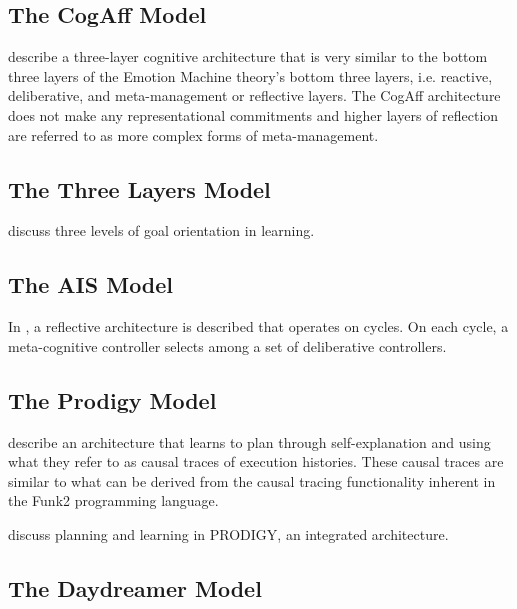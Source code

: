 \subsection{The CogAff Model}

\cite{sloman2001vaa} describe a three-layer cognitive architecture that is very similar to the bottom three layers of the Emotion Machine theory's bottom three layers, i.e. reactive, deliberative, and meta-management or reflective layers.
The CogAff architecture does not make any representational commitments and higher layers of reflection are referred to as more complex forms of meta-management.

\subsection{The Three Layers Model}

\cite{ngbereiter1995tlgol} discuss three levels of goal orientation in learning.

\subsection{The AIS Model}

In \cite{hayesroth1995aai}, a reflective architecture is described that operates on cycles.
On each cycle, a meta-cognitive controller selects among a set of deliberative controllers.

\subsection{The Prodigy Model}

\cite{carbonell1991pia} describe an architecture that learns to plan through self-explanation and using what they refer to as causal traces of execution histories.
These causal traces are similar to what can be derived from the causal tracing functionality inherent in the Funk2 programming language.

\cite{carbonell1995palp} discuss planning and learning in PRODIGY, an integrated architecture.

\subsection{The Daydreamer Model}


\cite{mueller1990dha}

























































